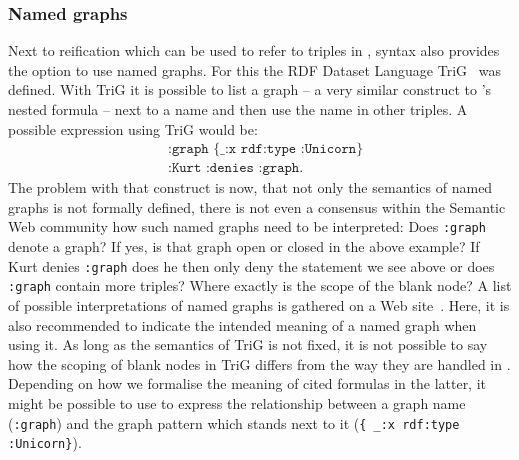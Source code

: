 \subsubsection{Named graphs}
Next to reification which can be used to refer to triples in \rdf, \rdf syntax also provides the option to use named graphs. For this the RDF Dataset Language TriG~\cite{TriG} was defined. With TriG it is possible to 
list a graph -- a very similar construct to \nthree's nested formula -- next to a name and then use the name in other triples. A possible expression using TriG would be:
\begin{equation}
 \begin{split}
& \texttt{:graph } \texttt{\{ \_:x rdf:type :Unicorn\}}\\
& \texttt{:Kurt } \texttt{:denies :graph.}
 \end{split}
\end{equation}
The problem with that construct is now, that not only the semantics of named graphs is not formally defined, there is not even a consensus within the Semantic Web community how 
such named graphs need to be interpreted: Does \texttt{:graph} denote a graph? If yes, is that graph open or closed in the above example? If Kurt denies \texttt{:graph} does he then only deny the statement we see above or does 
\texttt{:graph} contain more triples? Where exactly is the scope of the blank node? A list of possible interpretations of named graphs is gathered on a Web site~\cite{TriGsemantics}. 
Here, it is also recommended to indicate the intended meaning of a named graph when using it. As long as the semantics of TriG is not fixed, it is not possible to say how the scoping 
of blank nodes in TriG differs from the way they are handled in \nthree. Depending on how we formalise the meaning of cited formulas in the latter, it might be possible to use \nthree to 
express the relationship between a graph name (\texttt{:graph}) and the graph pattern which stands next to it (\texttt{\{ \_:x rdf:type :Unicorn\}}).

% 
% 

